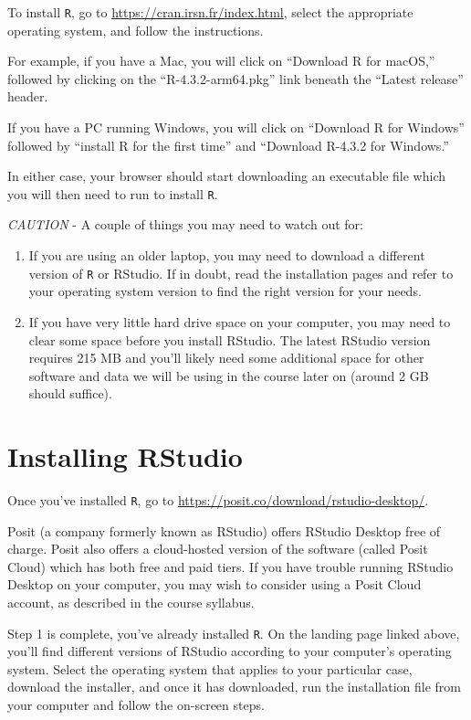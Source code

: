 \documentclass[
]{book}
\begin{document}
To install \texttt{R}, go to \url{https://cran.irsn.fr/index.html}, select the appropriate operating system, and follow the instructions.

For example, if you have a Mac, you will click on ``Download R for macOS,'' followed by clicking on the ``R-4.3.2-arm64.pkg'' link beneath the ``Latest release'' header.

If you have a PC running Windows, you will click on ``Download R for Windows'' followed by ``install R for the first time'' and ``Download R-4.3.2 for Windows.''

In either case, your browser should start downloading an executable file which you will then need to run to install \texttt{R}.

\emph{CAUTION} - A couple of things you may need to watch out for:

\begin{enumerate}
\def\labelenumi{\arabic{enumi}.}
\item
  If you are using an older laptop, you may need to download a different version of \texttt{R} or RStudio. If in doubt, read the installation pages and refer to your operating system version to find the right version for your needs.
\item
  If you have very little hard drive space on your computer, you may need to clear some space before you install RStudio. The latest RStudio version requires 215 MB and you'll likely need some additional space for other software and data we will be using in the course later on (around 2 GB should suffice).
\end{enumerate}

\hypertarget{installing-rstudio}{%
\section{Installing RStudio}\label{installing-rstudio}}

Once you've installed \texttt{R}, go to \url{https://posit.co/download/rstudio-desktop/}.

Posit (a company formerly known as RStudio) offers RStudio Desktop free of charge. Posit also offers a cloud-hosted version of the software (called Posit Cloud) which has both free and paid tiers. If you have trouble running RStudio Desktop on your computer, you may wish to consider using a Posit Cloud account, as described in the course syllabus.

Step 1 is complete, you've already installed \texttt{R}. On the landing page linked above, you'll find different versions of RStudio according to your computer's operating system. Select the operating system that applies to your particular case, download the installer, and once it has downloaded, run the installation file from your computer and follow the on-screen steps.
\end{document}
